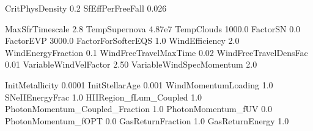
CritPhysDensity     0.2    %
SfEffPerFreeFall    0.026     %


MaxSfrTimescale     2.8         %
TempSupernova       4.87e7       %
TempClouds          1000.0      %
FactorSN            0.0         %
FactorEVP           3000.0      %
FactorForSofterEQS  1.0         %
WindEfficiency          2.0     %
WindEnergyFraction      0.1    %
WindFreeTravelMaxTime   0.02     %
WindFreeTravelDensFac   0.01     %
VariableWindVelFactor	2.50	%
VariableWindSpecMomentum  2.0	%


InitMetallicity             0.0001  %
InitStellarAge              0.001   %
WindMomentumLoading         1.0     %
SNeIIEnergyFrac             1.0     %
HIIRegion_fLum_Coupled      1.0     %
PhotonMomentum_Coupled_Fraction  1.0  %
PhotonMomentum_fUV          0.0    %
PhotonMomentum_fOPT         0.0    %
GasReturnFraction           1.0     %
GasReturnEnergy             1.0     %

